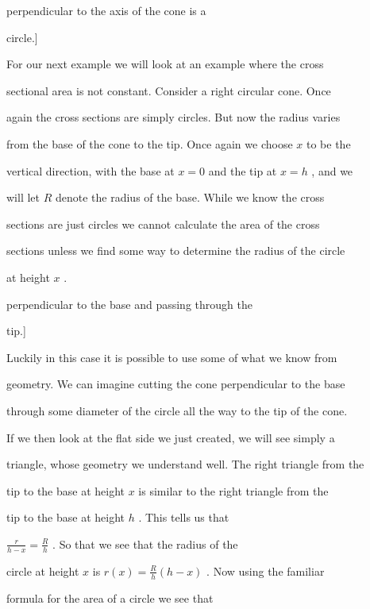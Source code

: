 
perpendicular to the axis of the cone is a

circle.]



For our next example we will look at an example where the cross

sectional area is not constant. Consider a right circular cone. Once

again the cross sections are simply circles. But now the radius varies

from the base of the cone to the tip. Once again we choose $x$ to be the

vertical direction, with the base at $x=0$ and the tip at $x=h$ , and we

will let $R$ denote the radius of the base. While we know the cross

sections are just circles we cannot calculate the area of the cross

sections unless we find some way to determine the radius of the circle

at height $x$ .




perpendicular to the base and passing through the

tip.]



Luckily in this case it is possible to use some of what we know from

geometry. We can imagine cutting the cone perpendicular to the base

through some diameter of the circle all the way to the tip of the cone.

If we then look at the flat side we just created, we will see simply a

triangle, whose geometry we understand well. The right triangle from the

tip to the base at height $x$ is similar to the right triangle from the

tip to the base at height $h$ . This tells us that

$\frac{r}{h-x}=\frac{R}{h}$ . So that we see that the radius of the

circle at height $x$ is $r(x)=\frac{R}{h}(h-x)$ . Now using the familiar

formula for the area of a circle we see that

